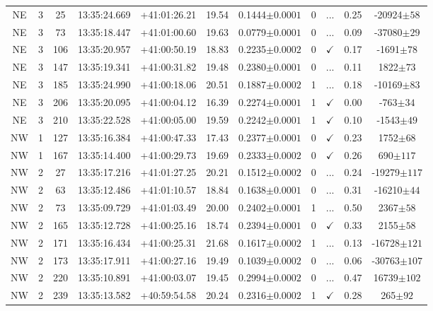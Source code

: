 \begin{landscape}
\begin{longtable}{ccccccccccc}
		NE & 3 & 25 & 13:35:24.669 & +41:01:26.21 & 19.54 & 0.1444$\pm{0.0001}$ & 0 & ... & 0.25 & -20924$\pm{58}$ \\
		NE & 3 & 73 & 13:35:18.447 & +41:01:00.60 & 19.63 & 0.0779$\pm{0.0001}$ & 0 & ... & 0.09 & -37080$\pm{29}$ \\
		NE & 3 & 106 & 13:35:20.957 & +41:00:50.19 & 18.83 & 0.2235$\pm{0.0002}$ & 0 & $\checkmark$ & 0.17 & -1691$\pm{78}$ \\
		NE & 3 & 147 & 13:35:19.341 & +41:00:31.82 & 19.48 & 0.2380$\pm{0.0001}$ & 0 & ... & 0.11 & 1822$\pm{73}$ \\
		NE & 3 & 185 & 13:35:24.990 & +41:00:18.06 & 20.51 & 0.1887$\pm{0.0002}$ & 1 & ... & 0.18 & -10169$\pm{83}$ \\
		NE & 3 & 206 & 13:35:20.095 & +41:00:04.12 & 16.39 & 0.2274$\pm{0.0001}$ & 1 & $\checkmark$ & 0.00 & -763$\pm{34}$ \\
		NE & 3 & 210 & 13:35:22.528 & +41:00:05.00 & 19.59 & 0.2242$\pm{0.0001}$ & 1 & $\checkmark$ & 0.10 & -1543$\pm{49}$ \\
		NW & 1 & 127 & 13:35:16.384 & +41:00:47.33 & 17.43 & 0.2377$\pm{0.0001}$ & 0 & $\checkmark$ & 0.23 & 1752$\pm{68}$ \\
		NW & 1 & 167 & 13:35:14.400 & +41:00:29.73 & 19.69 & 0.2333$\pm{0.0002}$ & 0 & $\checkmark$ & 0.26 & 690$\pm{117}$ \\
		NW & 2 & 27 & 13:35:17.216 & +41:01:27.25 & 20.21 & 0.1512$\pm{0.0002}$ & 0 & ... & 0.24 & -19279$\pm{117}$ \\
		NW & 2 & 63 & 13:35:12.486 & +41:01:10.57 & 18.84 & 0.1638$\pm{0.0001}$ & 0 & ... & 0.31 & -16210$\pm{44}$ \\
		NW & 2 & 73 & 13:35:09.729 & +41:01:03.49 & 20.00 & 0.2402$\pm{0.0001}$ & 1 & ... & 0.50 & 2367$\pm{58}$ \\
		NW & 2 & 165 & 13:35:12.728 & +41:00:25.16 & 18.74 & 0.2394$\pm{0.0001}$ & 0 & $\checkmark$ & 0.33 & 2155$\pm{58}$ \\
		NW & 2 & 171 & 13:35:16.434 & +41:00:25.31 & 21.68 & 0.1617$\pm{0.0002}$ & 1 & ... & 0.13 & -16728$\pm{121}$ \\
		NW & 2 & 173 & 13:35:17.911 & +41:00:27.16 & 19.49 & 0.1039$\pm{0.0002}$ & 0 & ... & 0.06 & -30763$\pm{107}$ \\
		NW & 2 & 220 & 13:35:10.891 & +41:00:03.07 & 19.45 & 0.2994$\pm{0.0002}$ & 0 & ... & 0.47 & 16739$\pm{102}$ \\
		NW & 2 & 239 & 13:35:13.582 & +40:59:54.58 & 20.24 & 0.2316$\pm{0.0002}$ & 1 & $\checkmark$ & 0.28 & 265$\pm{92}$ \\

\end{longtable}
\end{landscape}
